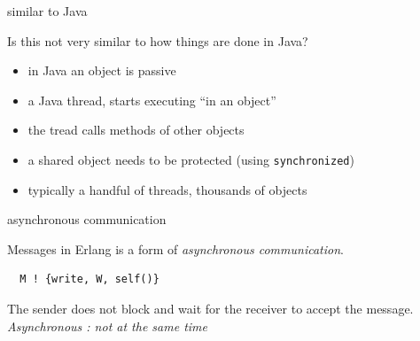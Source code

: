 \begin{frame}{similar to Java}

Is this not very similar to how things are done in Java?

\pause\vspace{20pt}
\begin{itemize}
\item in Java an object is passive
\pause
\item a Java thread, starts executing ``in an object''
\pause
\item the tread calls methods of other objects
\pause
\item a shared object needs to be protected (using {\tt synchronized})
\pause
\item typically a handful of threads, thousands of objects
\end{itemize}

\end{frame}

\begin{frame}[fragile]{asynchronous communication}

Messages in Erlang is a form of {\em asynchronous communication}.

\pause\vspace{20pt}
\begin{verbatim}
  M ! {write, W, self()}
\end{verbatim}

\pause\vspace{20pt}
The sender does not block and wait for the receiver to accept the message. 
\pause\vspace{20pt}
{\em Asynchronous : not at the same time}
\end{frame}

